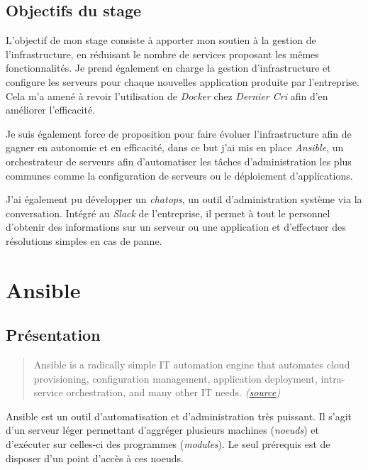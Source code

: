 \documentclass[11pt,a4paper]{article}
\begin{document}
  \newpage

  \subsection{Objectifs du stage}\label{objectifs-du-stage}

  L'objectif de mon stage consiste à apporter mon soutien à la gestion de
  l'infrastructure, en réduisant le nombre de services proposant les mêmes
  fonctionnalités. Je prend également en charge la gestion
  d'infrastructure et configure les serveurs pour chaque nouvelles
  application produite par l'entreprise. Cela m'a amené à revoir
  l'utilisation de \emph{Docker} chez \emph{Dernier Cri} afin d'en
  améliorer l'efficacité.

  \bigskip

  Je suis également force de proposition pour faire évoluer
  l'infrastructure afin de gagner en autonomie et en efficacité, dans ce
  but j'ai mis en place \emph{Ansible}, un orchestrateur de serveurs afin
  d'automatiser les tâches d'administration les plus communes comme la
  configuration de serveurs ou le déploiement d'applications.

  \bigskip

  J'ai également pu développer un \emph{chatops}, un outil
  d'administration système via la conversation. Intégré au \emph{Slack} de
  l'entreprise, il permet à tout le personnel d'obtenir des informations
  sur un serveur ou une application et d'effectuer des résolutions simples
  en cas de panne.

  \newpage

  \section{Ansible}\label{ansible}

  \subsection{Présentation}\label{pruxe9sentation}

  \begin{quote}
  Ansible is a radically simple IT automation engine that automates cloud
  provisioning, configuration management, application deployment,
  intra-service orchestration, and many other IT needs.
  \emph{(\href{https://www.ansible.com/how-ansible-works}{source})}
  \end{quote}

  \bigskip
  Ansible est un outil d'automatisation et d'administration très puissant.
  Il s'agit d'un serveur léger permettant d'aggréger plusieurs machines
  (\emph{noeuds}) et d'exécuter sur celles-ci des programmes
  (\emph{modules}). Le seul prérequis est de disposer d'un point d'accès à
  ces noeuds.
\end{document}
